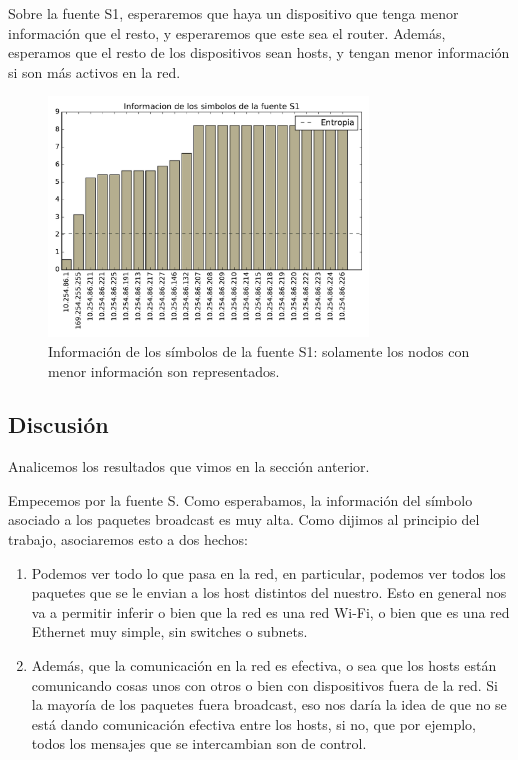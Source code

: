 Sobre la fuente S1, esperaremos que haya un dispositivo que tenga menor información que el resto, y esperaremos que este sea el router. Además, esperamos que el resto de los dispositivos sean hosts, y tengan menor información si son más activos en la red.

\begin{figure}[H]
  \centering
  \includegraphics[width=8.5cm]{exp_starbucks/grafico3.pdf}
  \caption{ \normalfont Información de los símbolos de la fuente S1: solamente los nodos con menor información son representados.}
\end{figure}

\subsection{Discusión}

Analicemos los resultados que vimos en la sección anterior.

Empecemos por la fuente S. Como esperabamos, la información del símbolo asociado a los paquetes broadcast es muy alta. Como dijimos al principio del trabajo, asociaremos esto a dos hechos: 

\begin{enumerate}
  \item Podemos ver todo lo que pasa en la red, en particular, podemos ver todos los paquetes que se le envian a los host distintos del nuestro.
    Esto en general nos va a permitir inferir o bien que la red es una red Wi-Fi, o bien que es una red Ethernet muy simple, sin switches o subnets.
  \item Además, que la comunicación en la red es efectiva, o sea que los hosts están comunicando cosas unos con otros o bien con dispositivos fuera de la red.
    Si la mayoría de los paquetes fuera broadcast, eso nos daría la idea de que no se está dando comunicación efectiva entre los hosts, si no, que por ejemplo, todos los mensajes que se intercambian son de control.
\end{enumerate}

